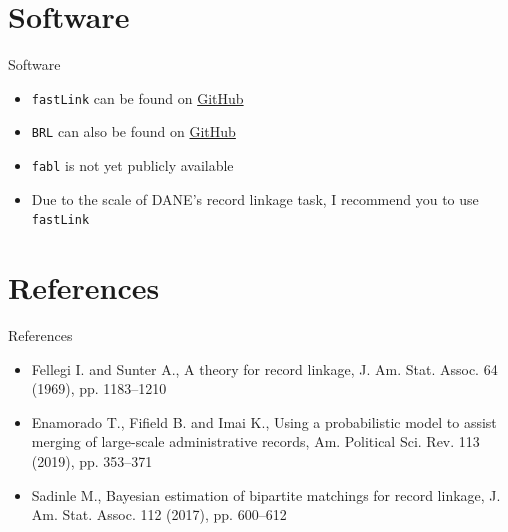 \documentclass{beamer}
\begin{document}
\section{Software}
\begin{frame}{Software}
	\begin{itemize}
		\item \texttt{fastLink} can be found on \href{https://github.com/kosukeimai/fastLink}{GitHub}
		\item \texttt{BRL} can also be found on \href{https://github.com/cran/BRL}{GitHub}
		\item \texttt{fabl} is not yet publicly available
		\item Due to the scale of DANE's record linkage task, I recommend you to use \texttt{fastLink}
	\end{itemize}
\end{frame}

\section{References}
\begin{frame}{References}
	\begin{itemize}
		\item Fellegi I. and Sunter A., A theory for record linkage, J. Am. Stat. Assoc. 64 (1969), pp. 1183–1210
		\item Enamorado T., Fifield B. and Imai K., Using a probabilistic model to assist merging of large-scale administrative records, Am. Political Sci. Rev. 113 (2019), pp. 353–371
		\item Sadinle M., Bayesian estimation of bipartite matchings for record linkage, J. Am. Stat. Assoc. 112 (2017), pp. 600–612
	\end{itemize}
\end{frame}
\end{document}
